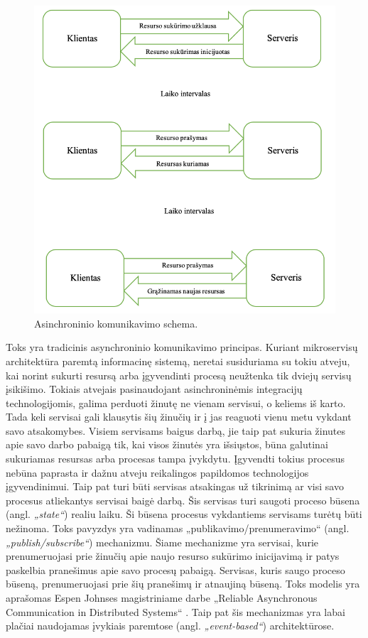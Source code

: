 \begin{figure}[H]
  \centering
  \includegraphics[scale=0.45]{img/asynchronous-communication}
  \caption{Asinchroninio komunikavimo schema.}
  \label{img:asynchronous-communication}
\end{figure}
\break

Toks yra tradicinis asynchroninio komunikavimo principas. Kuriant mikroservisų architektūra paremtą informacinę sistemą,
neretai susiduriama su tokiu atveju, kai norint sukurti resursą arba įgyvendinti procesą neužtenka tik dviejų servisų įsikišimo.
Tokiais atvejais pasinaudojant asinchroninėmis integracijų technologijomis, galima perduoti žinutę ne vienam servisui, o keliems iš karto.
Tada keli servisai gali klausytis šių žinučių ir į jas reaguoti vienu metu vykdant savo atsakomybes. Visiem servisams baigus darbą,
jie taip pat sukuria žinutes apie savo darbo pabaigą tik, kai visos žinutės yra išsiųstos, būna galutinai sukuriamas resursas arba procesas
tampa įvykdytu. Įgyvendti tokius procesus nebūna paprasta ir dažnu atveju reikalingos papildomos technologijos įgyvendinimui.
Taip pat turi būti servisas atsakingas už tikrinimą ar visi savo procesus atliekantys servisai baigė darbą. Šis servisas turi
saugoti proceso būsena (angl. \textit{„state“}) realiu laiku. Ši būsena procesus vykdantiems servisams turėtų būti nežinoma.
Toks pavyzdys yra vadinamas „publikavimo/prenumeravimo“ (angl. \textit{„publish/subscribe“}) mechanizmu. Šiame mechanizme yra
servisai, kurie prenumeruojasi prie žinučių apie naujo resurso sukūrimo inicijavimą ir patys paskelbia pranešimus apie savo procesų pabaigą.
Servisas, kuris saugo proceso būseną, prenumeruojasi prie šių pranešimų ir atnaujiną būseną. Toks modelis yra aprašomas Espen Johnses magistriniame darbe
„Reliable Asynchronous Communication in Distributed Systems“ \cite{MstrThs1}. Taip pat šis mechanizmas yra labai plačiai naudojamas
įvykiais paremtose (angl. \textit{„event-based“}) architektūrose.

